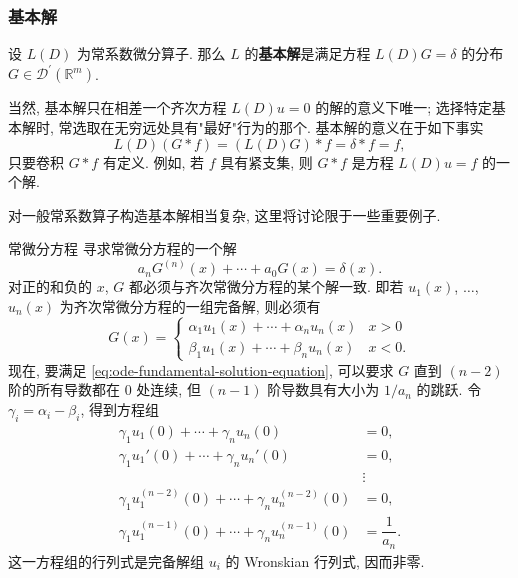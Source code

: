 \subsubsection{基本解}\label{subsec:fundamental-solutions}

\begin{Definition}
\label{def:fundamental-solution}
设 $L(D)$ 为常系数微分算子. 那么 $L$ 的\textbf{基本解}是满足方程 $L(D)G=\delta$ 的分布 $G\in\mathcal{D}^{\prime}(\mathbb{R}^m)$.
\end{Definition}

当然, 基本解只在相差一个齐次方程 $L(D)u=0$ 的解的意义下唯一; 选择特定基本解时, 常选取在无穷远处具有"最好"行为的那个. 基本解的意义在于如下事实
\begin{equation}\label{eq:fundamental-solution-convolution-identity}
L(D)(G*f)=(L(D)G)*f=\delta*f=f,
\end{equation}
只要卷积 $G*f$ 有定义. 例如, 若 $f$ 具有紧支集, 则 $G*f$ 是方程 $L(D)u=f$ 的一个解.

对一般常系数算子构造基本解相当复杂, 这里将讨论限于一些重要例子.

\begin{Example}{常微分方程}
\label{ex:ode-fundamental-solution}
寻求常微分方程的一个解
\begin{equation}\label{eq:ode-fundamental-solution-equation}
a_nG^{(n)}(x)+\cdots+a_0G(x)=\delta(x).
\end{equation}
对正的和负的 $x$, $G$ 都必须与齐次常微分方程的某个解一致. 即若 $u_1(x)$, $\ldots$, $u_n(x)$ 为齐次常微分方程的一组完备解, 则必须有
\begin{equation}\label{eq:ode-fundamental-solution-piecewise-basis}
G(x)=\begin{cases}\alpha_1u_1(x)+\cdots+\alpha_nu_n(x)&x>0\\\beta_1u_1(x)+\cdots+\beta_nu_n(x)&x<0.\end{cases}
\end{equation}
现在, 要满足 \eqref{eq:ode-fundamental-solution-equation}, 可以要求 $G$ 直到 $(n-2)$ 阶的所有导数都在 0 处连续, 但 $(n-1)$ 阶导数具有大小为 $1/a_n$ 的跳跃. 令 $\gamma_i=\alpha_i-\beta_i$, 得到方程组
\begin{equation}\label{eq:ode-fundamental-solution-jump-system}
\begin{aligned}
\gamma_1u_1(0)+\cdots+\gamma_nu_n(0)&=0,\\
\gamma_1u_1'(0)+\cdots+\gamma_nu_n'(0)&=0,\\
&\vdots\\
\gamma_1u_1^{(n-2)}(0)+\cdots+\gamma_nu_n^{(n-2)}(0)&=0,\\
\gamma_1u_1^{(n-1)}(0)+\cdots+\gamma_nu_n^{(n-1)}(0)&=\dfrac1{a_n}.
\end{aligned}
\end{equation}
这一方程组的行列式是完备解组 $u_i$ 的 Wronskian 行列式, 因而非零.
\end{Example}

